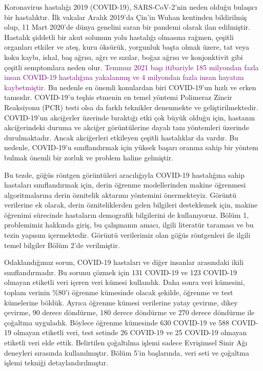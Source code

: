 Koronavirus hastalığı 2019 (COVID-19), SARS-CoV-2'nin neden olduğu bulaşıcı bir hastalıktır. İlk vakalar Aralık 2019'da Çin'in Wuhan kentinden bildirilmiş olup, 11 Mart 2020'de dünya genelini saran bir pandemi olarak ilan edilmiştir. Hastalık şiddetli bir akut solunum yolu hastalığı olmasına rağmen, çeşitli organları etkiler ve ateş, kuru öksürük, yorgunluk başta olmak üzere, tat veya koku kaybı, ishal, baş ağrısı, ağrı ve sızılar, boğaz ağrısı ve konjonktivit gibi çeşitli semptomlara neden olur. \textcolor{purple}{Temmuz 2021 başı itibariyle 185 milyondan fazla insan COVID-19 hastalığına yakalanmış ve 4 milyondan fazla insan hayatını kaybetmiştir.} Bu nedenle en önemli konulardan biri COVID-19'un hızlı ve erken tanısıdır. COVID-19'u teşhis etmenin en temel yöntemi Polimeraz Zincir Reaksiyonu (PCR) testi olsa da farklı teknikler denenmekte ve geliştirilmektedir. COVID-19'un akciğerler üzerinde bıraktığı etki çok büyük olduğu için, hastanın akciğerindeki duruma ve akciğer görüntülerine dayalı tanı yöntemleri üzerinde durulmaktadır. Ancak akciğerleri etkileyen çeşitli hastalıklar da vardır. Bu nedenle, COVID-19'u sınıflandırmak için yüksek başarı oranına sahip bir yöntem bulmak önemli bir zorluk ve problem haline gelmiştir.

Bu tezde, göğüs röntgen görüntüleri aracılığıyla COVID-19 hastalığına sahip hastaları sınıflandırmak için, derin öğrenme modellerinden makine öğrenmesi algoritmalarına derin öznitelik aktarımı yöntemini önermekteyiz. Görüntü verilerine ek olarak, derin özniteliklerden gelen bilgileri desteklemek için, makine öğrenimi sürecinde hastaların demografik bilgilerini de kullanıyoruz. Bölüm 1, problemimiz hakkında giriş, bu çalışmanın amacı, ilgili literatür taraması ve bu tezin yapısını içermektedir. Görüntü verilerimiz olan göğüs röntgenleri ile ilgili temel bilgiler Bölüm 2'de verilmiştir.

Odaklandığımız sorun, COVID-19 hastaları ve diğer insanlar arasındaki ikili sınıflandırmadır. Bu sorunu çözmek için 131 COVID-19 ve 123 COVID-19 olmayan etiketli veri içeren veri kümesi kullandık. Daha sonra veri kümesini, toplam verinin \%80'i öğrenme kümesinde olacak şekilde, öğrenme ve test kümelerine böldük. Ayrıca öğrenme kümesi verilerine yatay çevirme, dikey çevirme, 90 derece döndürme, 180 derece döndürme ve 270 derece döndürme ile çoğaltma uyguladık. Böylece öğrenme kümesinde 630 COVID-19 ve 588 COVID-19 olmayan etiketli veri, test setinde 26 COVID-19 ve 25 COVID-19 olmayan etiketli veri elde ettik. Belirtilen çoğaltılma işlemi sadece Evrişimsel Sinir Ağı deneyleri sırasında kullanılmıştır. Bölüm 5'in başlarında, veri seti ve çoğaltma işlemi tekniği detaylandırılmıştır.

